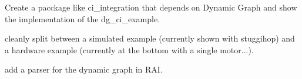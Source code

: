 
\begin{DoxyRefList}
\item[\label{todo__todo000001}%
\Hypertarget{todo__todo000001}%
Page \hyperlink{subpage_basic_control_graph}{5/ Basic Control Graph} ]Create a pacckage like ci\+\_\+integration that depends on Dynamic Graph and show the implementation of the dg\+\_\+ci\+\_\+example.

cleanly split between a simulated example (currently shown with stuggihop) and a hardware example (currently at the bottom with a single motor...). 
\item[\label{todo__todo000003}%
\Hypertarget{todo__todo000003}%
Page \hyperlink{subpage_plot}{5/ Oscilloscope / Plotting / Logging / Motor and control process timing} ]add a parser for the dynamic graph in R\+AI.
\end{DoxyRefList}